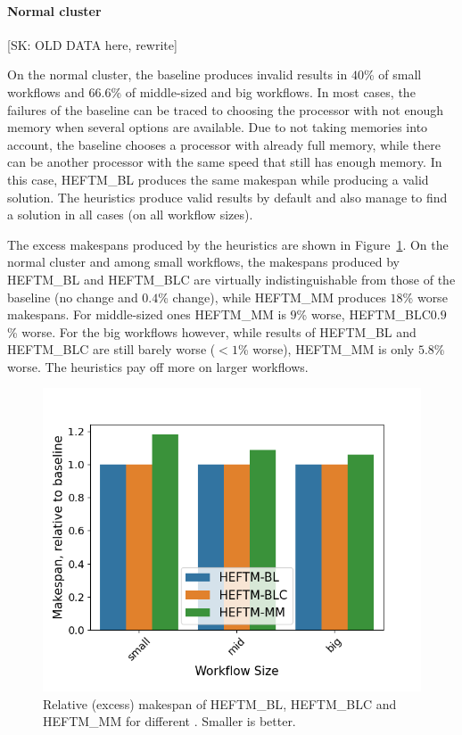 \documentclass[conference]{IEEEtran}
\newcommand{\algo}[1]{\textsc{#1}}
\newcommand{\heftmm}{\algo{HEFTM\_MM}\xspace}
\newcommand{\heftbl}{\algo{HEFTM\_BL}\xspace}
\newcommand{\heftblc}{\algo{HEFTM\_BLC}\xspace}
\newcommand{\skug}[1]{{\color{blue}[SK: #1]}}
\begin{document}
    \paragraph{Normal cluster}
    \skug{OLD DATA here, rewrite}

    On the normal cluster, the baseline produces invalid results in $40$\% of small workflows and $66.6$\% of middle-sized
    and big workflows.
    In most cases, the failures of the baseline can be traced to choosing the processor with not enough memory when several
    options are available.
    Due to not taking memories into account, the baseline chooses a processor with already full memory, while there can
    be another processor with the same speed that still has enough memory.
    In this case, \heftbl produces the same makespan while producing a valid solution.
    The heuristics produce valid results by default and also manage to find a solution in all cases (on all workflow sizes).

    The excess makespans produced by the heuristics are shown in Figure~\ref{fig:excess-ms}.
    On the normal cluster and among small workflows, the makespans produced by \heftbl and \heftblc are virtually indistinguishable
    from those of the baseline (no change and $0.4$\% change), while \heftmm produces  $18$\% worse makespans.
    For middle-sized ones \heftmm is $9$\% worse,  \heftblc $0.9$\% worse.
    For the big workflows however, while results of \heftbl and \heftblc are still barely worse ($<1$\% worse),
     \heftmm is only $5.8$\% worse.
    The heuristics pay off more on larger workflows.

    \begin{figure}[tb]
        \centering
        \includegraphics[width=0.495\columnwidth] {images/ms-relative-3groups}
        \caption{Relative (excess) makespan of \heftbl, \heftblc and \heftmm for different . Smaller is better.}
       \label{fig:excess-ms}
        \vspace{-0.3cm}
    \end{figure}
\end{document}
